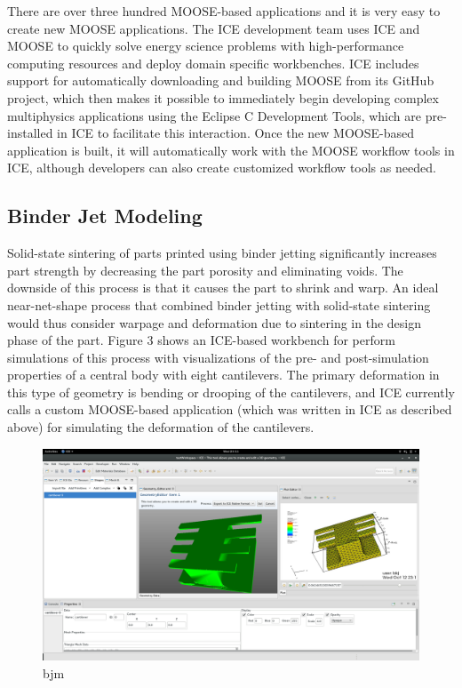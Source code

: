 There are over three hundred MOOSE-based applications and it is very
easy to create new MOOSE applications. The ICE development team uses ICE
and MOOSE to quickly solve energy science problems with high-performance
computing resources and deploy domain specific workbenches. ICE includes
support for automatically downloading and building MOOSE from its GitHub
project, which then makes it possible to immediately begin developing
complex multiphysics applications using the Eclipse C Development Tools,
which are pre-installed in ICE to facilitate this interaction. Once the
new MOOSE-based application is built, it will automatically work with
the MOOSE workflow tools in ICE, although developers can also create
customized workflow tools as needed.

\subsection{Binder Jet Modeling}\label{binder-jet-modeling}

Solid-state sintering of parts printed using binder jetting
significantly increases part strength by decreasing the part porosity
and eliminating voids. The downside of this process is that it causes
the part to shrink and warp. An ideal near-net-shape process that
combined binder jetting with solid-state sintering would thus consider
warpage and deformation due to sintering in the design phase of the
part. Figure 3 shows an ICE-based workbench for perform simulations of
this process with visualizations of the pre- and post-simulation
properties of a central body with eight cantilevers. The primary
deformation in this type of geometry is bending or drooping of the
cantilevers, and ICE currently calls a custom MOOSE-based application
(which was written in ICE as described above) for simulating the
deformation of the cantilevers.

\begin{figure}[htbp]
\centering
\includegraphics[width=\textwidth]{images/ice-bjm.png}
\caption{bjm}
\end{figure}

